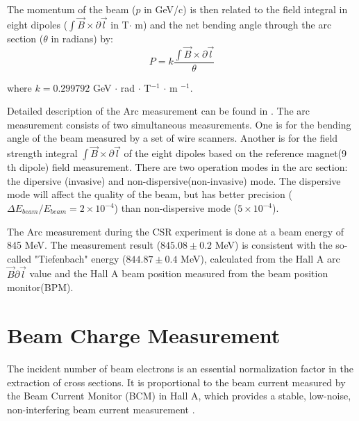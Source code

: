 The momentum of the beam ($p$ in GeV/c) is then related to the field integral in eight dipoles ($\int\vec{B}\times\partial\vec{l}$
in T$\cdot$ m) and the net bending angle through the arc section ($\theta$ in radians) by:
\begin{equation}
  P = k \frac{\int\vec{B}\times\partial\vec{l}}{\theta}
\end{equation}

where $k=0.299792$ GeV $\cdot$ rad $\cdot$ T$^{-1}$ $\cdot$ m $^{-1}$. 

Detailed description of the Arc measurement can be found in \cite{Alcorn2004}.
The arc measurement consists of two simultaneous measurements. One is for the bending angle of the beam measured by a set of wire scanners. Another is for the field strength integral $\int\vec{B}\times\partial\vec{l}$ of the eight dipoles based on the reference magnet(9 th dipole) field measurement.
There are two operation modes in the arc section: the dipersive (invasive) and non-dispersive(non-invasive) mode. The
dispersive mode will affect the quality of the beam, but has better precision ($\Delta E_{beam}/E_{beam} = 2\times10^{-4}$) than non-dispersive mode ($5\times10^{-4}$).

The Arc measurement during the CSR experiment is done at a beam energy of 845 MeV. The measurement result ($845.08 \pm
0.2$ MeV) is consistent with the so-called "Tiefenbach" energy ($844.87 \pm 0.4$ MeV), calculated from the Hall A arc
$\vec{B}\partial\vec{l}$ value and the Hall A beam position measured from the beam position monitor(BPM). 





\section{Beam Charge Measurement}
The incident number of beam electrons is an essential normalization factor in the extraction of cross sections.
It is proportional to the beam current measured by the Beam Current Monitor (BCM) in Hall A,
which provides a stable, low-noise, non-interfering beam current measurement \cite{Alcorn2004}.

